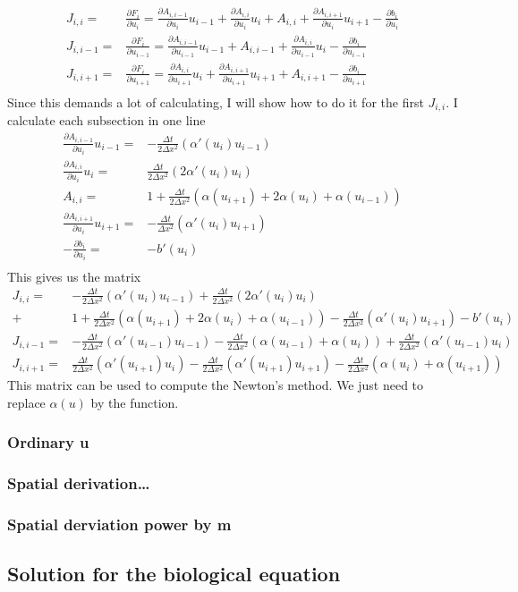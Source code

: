 \documentclass[norsk,11pt,a4paper]{article}
\begin{document}
\begin{align*}
J_{i,i}=& \frac{\partial F_i}{\partial u_i}=\frac{\partial A_{i,i-1}}{\partial u_i}u_{i-1}
+ \frac{\partial A_{i,i}}{\partial u_i}u_i+ A_{i,i}
+ \frac{\partial A_{i,i+1}}{\partial u_i}u_{i+1}
- \frac{\partial b_i}{\partial u_{i}}\\ 
J_{i,i-1}=& \frac{\partial F_i}{\partial u_{i-1}}=\frac{\partial A_{i,i-1}}{\partial u_{i-1}}u_{i-1}
+ A_{i,i-1}+\frac{\partial A_{i,i}}{\partial u_{i-1}}u_i
- \frac{\partial b_i}{\partial u_{i-1}}\\ 
J_{i,i+1}=& \frac{\partial F_i}{\partial u_{i+1}}= \frac{\partial A_{i,i}}{\partial u_{i+1}}u_i
+ \frac{\partial A_{i,i+1}}{\partial u_{i+1}}u_{i+1}+A_{i,i+1}
- \frac{\partial b_i}{\partial u_{i+1}}\\ 
\end{align*}
Since this demands a lot of calculating, I will show how to do it for the first
$J_{i,i}$. I calculate each subsection in one line
\begin{align*}
\frac{\partial A_{i,i-1}}{\partial u_i}u_{i-1}=&-\frac{\Delta t}{2\Delta x^2}(\alpha'(u_i)u_{i-1})\\
\frac{\partial A_{i,i}}{\partial u_i}u_i=&\frac{\Delta t}{2\Delta x^2}(2\alpha'(u_i)u_{i})\\
A_{i,i}=&1+\frac{\Delta t}{2\Delta x^2}(\alpha(u_{i+1})+2\alpha(u_i)+\alpha(u_{i-1}))\\
\frac{\partial A_{i,i+1}}{\partial u_i}u_{i+1}=&-\frac{\Delta t}{\Delta x^2}(\alpha'(u_i)u_{i+1})\\
- \frac{\partial b_i}{\partial u_{i}}=& -b'(u_i)\\
\end{align*}
This gives us the matrix
\begin{align*}
J_{i,i} =&-\frac{\Delta t}{2\Delta x^2}(\alpha'(u_i)u_{i-1})+\frac{\Delta t}{2\Delta x^2}(2\alpha'(u_i)u_{i})\\
+&1+\frac{\Delta t}{2\Delta x^2}(\alpha(u_{i+1})+2\alpha(u_i)+\alpha(u_{i-1}))-\frac{\Delta t}{2\Delta x^2}(\alpha'(u_i)u_{i+1})-b'(u_i)\\
J_{i,i-1} =&-\frac{\Delta t}{2\Delta x^2}(\alpha'(u_{i-1})u_{i-1})-\frac{\Delta t}{2\Delta x^2}(\alpha(u_{i-1})+\alpha(u_i))+\frac{\Delta t}{2\Delta x^2}(\alpha'(u_{i-1})u_{i})\\
J_{i,i+1} =&\frac{\Delta t}{2\Delta x^2}(\alpha'(u_{i+1})u_{i})-\frac{\Delta t}{2\Delta x^2}(\alpha'(u_{i+1})u_{i+1})-\frac{\Delta t}{2\Delta x^2}(\alpha(u_i)+\alpha(u_{i+1}))
\end{align*}
This matrix can be used to compute the Newton's method. We just need to replace $\alpha(u)$ by the function. 
\subsubsection*{Ordinary u}
\subsubsection*{Spatial derivation\dots}
\subsubsection*{Spatial derviation power by m}
\subsection*{Solution for the biological equation}
\end{document}
